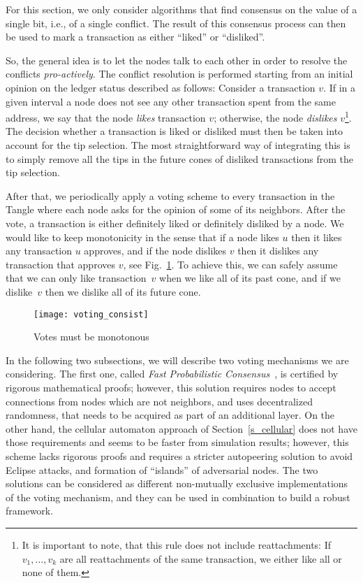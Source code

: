 \documentclass[../main.tex]{subfiles}
\begin{document}
For this section, we only consider algorithms that find consensus on the value of a single bit, i.e., of a single conflict. The result of this consensus process can then be used to mark a transaction as either \enquote{liked} or \enquote{disliked}.

So, the general idea is to let the nodes talk to each other in order to resolve the conflicts \textit{pro-actively}. The conflict resolution is performed starting from an initial opinion on the ledger status described as follows:
Consider a transaction $v$. If in a given interval a node does not see any other transaction spent from the same address, we say that the node \textit{likes} transaction $v$; otherwise, the node \textit{dislikes} $v$\footnote{It is important to note, that this rule does not include reattachments: If $v_1,\ldots ,v_k$ are all reattachments of the same transaction, we either like all or none of them.}.
The decision whether a transaction is liked or disliked must then be taken into account for the tip selection.
The most straightforward way of integrating this is to simply remove 
all the tips in the future cones of disliked transactions 
 from the tip selection.

After that, we periodically apply a voting scheme to every transaction in the Tangle where each node asks for the opinion of some of its neighbors. After the vote, a transaction is either definitely liked or definitely disliked by a node.
We would like to keep monotonicity in the sense that if a node likes $u$ then it likes any transaction $u$ approves, and if the node dislikes $v$ then it dislikes any transaction that approves $v$, see Fig.~\ref{f_voting_consist}.
To achieve this, we can safely assume that we can only like transaction~$v$ when we like all of its past cone, and if we dislike~$v$ then we dislike all of its future cone.

\begin{figure}
\begin{center}
\texttt{[image: voting\_consist]}
\caption{Votes must be monotonous}
\label{f_voting_consist}
\end{center}
\end{figure}

In the following two subsections, we will describe two voting mechanisms we are considering.
The first one, called \emph{Fast Probabilistic Consensus}~\cite{popov2019}, is certified by rigorous mathematical proofs; however, this solution requires nodes to accept connections from nodes which are not neighbors, and uses decentralized randomness, that needs to be acquired as part of an additional layer.
On the other hand, the cellular automaton approach of Section~\ref{s_cellular} does not have those requirements and seems to be faster from simulation results; however, this scheme lacks rigorous proofs and requires a stricter autopeering solution to avoid Eclipse attacks, and formation of \enquote{islands} of adversarial nodes.
The two solutions can be considered as different non-mutually exclusive implementations of the voting mechanism, and they can be used in combination to build a robust framework.
\end{document}
